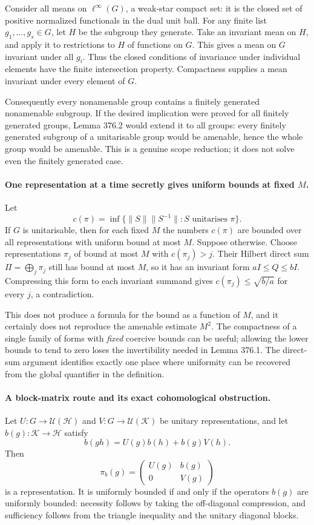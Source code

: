 \documentclass[11pt]{article}
\begin{document}
Consider all means on $\ell^\infty(G)$, a weak-star compact set:
it is the closed set of positive normalized functionals in the dual
unit ball. For any finite list $g_1,\ldots,g_s\in G$, let $H$ be the
subgroup they generate. Take an invariant mean on $H$, and apply it
to restrictions to $H$ of functions on $G$. This gives a mean on $G$
invariant under all $g_i$. Thus the closed conditions of invariance
under individual elements have the finite intersection property.
Compactness supplies a mean invariant under every element of $G$.

Consequently every nonamenable group contains a finitely generated
nonamenable subgroup. If the desired implication were proved for all
finitely generated groups, Lemma 376.2 would extend it to all groups:
every finitely generated subgroup of a unitarisable group would be
amenable, hence the whole group would be amenable. This is a genuine
scope reduction; it does not solve even the finitely generated case.

\paragraph{One representation at a time secretly gives uniform bounds at fixed $M$.}
Let
\[
 c(\pi)=\inf\{\|S\|\|S^{-1}\|:S\text{ unitarises }\pi\}.
\]
If $G$ is unitarisable, then for each fixed $M$ the numbers $c(\pi)$
are bounded over all representations with uniform bound at most $M$.
Suppose otherwise. Choose representations $\pi_j$ of bound at most
$M$ with $c(\pi_j)>j$. Their Hilbert direct sum $\Pi=\bigoplus_j\pi_j$
still has bound at most $M$, so it has an invariant form
$aI\le Q\le bI$. Compressing this form to each invariant summand
gives $c(\pi_j)\le\sqrt{b/a}$ for every $j$, a contradiction.

This does not produce a formula for the bound as a function of $M$,
and it certainly does not reproduce the amenable estimate $M^2$.
The compactness of a single family of forms with \emph{fixed} coercive
bounds can be useful; allowing the lower bounds to tend to zero loses
the invertibility needed in Lemma 376.1. The direct-sum argument identifies
exactly one place where uniformity can be recovered from the global
quantifier in the definition.

\paragraph{A block-matrix route and its exact cohomological obstruction.}
Let $U:G\to\mathcal U(\mathcal H)$ and
$V:G\to\mathcal U(\mathcal K)$ be unitary representations, and let
$b(g):\mathcal K\to\mathcal H$ satisfy
\[
 b(gh)=U(g)b(h)+b(g)V(h).
 \tag{376.3}
\]
Then
\[
 \pi_b(g)=\begin{pmatrix}U(g)&b(g)\\0&V(g)\end{pmatrix}
 \tag{376.4}
\]
is a representation. It is uniformly bounded if and only if the
operators $b(g)$ are uniformly bounded: necessity follows by taking
the off-diagonal compression, and sufficiency follows from the triangle
inequality and the unitary diagonal blocks.
\end{document}
